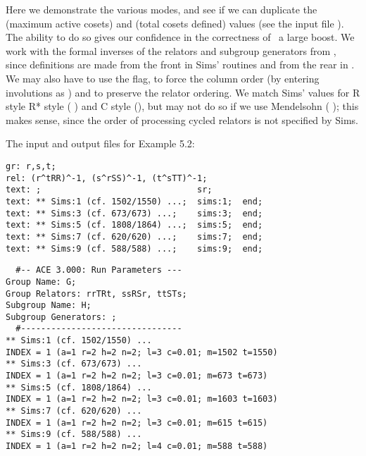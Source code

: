 


Here we demonstrate the various  modes, and see if we can
  duplicate the  (maximum active cosets) and  (total cosets
  defined) values (see the input file ).
The ability to do so gives our confidence in the correctness of \ace\ a
  large boost.
We work with the formal inverses of the relators and subgroup generators
  from \cite{Sim94}, since definitions are made from the front in Sims'
  routines and from the rear in \ace.
We may also have to use the  flag, to force the column order (by
  entering involutions as ) and to preserve the relator ordering.
We match Sims' values for R style \amp R* style ( \amp 
  ) and C style (), but may not do so if we use
  Mendelsohn ( \amp {}); this makes sense, since the
  order of processing cycled relators is not specified by Sims.

The input and output files for Example 5.2:

\bv\begin{verbatim}
gr: r,s,t;
rel: (r^tRR)^-1, (s^rSS)^-1, (t^sTT)^-1;
text: ;                               sr;
text: ** Sims:1 (cf. 1502/1550) ...;  sims:1;  end;
text: ** Sims:3 (cf. 673/673) ...;    sims:3;  end;
text: ** Sims:5 (cf. 1808/1864) ...;  sims:5;  end;
text: ** Sims:7 (cf. 620/620) ...;    sims:7;  end;
text: ** Sims:9 (cf. 588/588) ...;    sims:9;  end;
\end{verbatim}\ev

\bv\begin{verbatim}
  #-- ACE 3.000: Run Parameters ---
Group Name: G;
Group Relators: rrTRt, ssRSr, ttSTs;
Subgroup Name: H;
Subgroup Generators: ;
  #--------------------------------
** Sims:1 (cf. 1502/1550) ...
INDEX = 1 (a=1 r=2 h=2 n=2; l=3 c=0.01; m=1502 t=1550)
** Sims:3 (cf. 673/673) ...
INDEX = 1 (a=1 r=2 h=2 n=2; l=3 c=0.01; m=673 t=673)
** Sims:5 (cf. 1808/1864) ...
INDEX = 1 (a=1 r=2 h=2 n=2; l=3 c=0.01; m=1603 t=1603)
** Sims:7 (cf. 620/620) ...
INDEX = 1 (a=1 r=2 h=2 n=2; l=3 c=0.01; m=615 t=615)
** Sims:9 (cf. 588/588) ...
INDEX = 1 (a=1 r=2 h=2 n=2; l=4 c=0.01; m=588 t=588)
\end{verbatim}\ev

